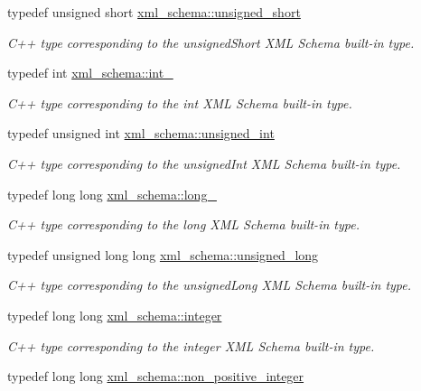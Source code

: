 \begin{DoxyCompactItemize}
typedef unsigned short \hyperlink{namespacexml__schema_a7fc7b4a846c512c370346e15dfdcecaa}{xml\+\_\+schema\+::unsigned\+\_\+short}
\begin{DoxyCompactList}\small\item\em C++ type corresponding to the unsigned\+Short X\+M\+L Schema built-\/in type. \end{DoxyCompactList}\item 
typedef int \hyperlink{namespacexml__schema_acfa24ac68e1a188e7f44c36f7a158bf4}{xml\+\_\+schema\+::int\+\_\+}
\begin{DoxyCompactList}\small\item\em C++ type corresponding to the int X\+M\+L Schema built-\/in type. \end{DoxyCompactList}\item 
typedef unsigned int \hyperlink{namespacexml__schema_a85ca3205d8af287e149aac54535f57e7}{xml\+\_\+schema\+::unsigned\+\_\+int}
\begin{DoxyCompactList}\small\item\em C++ type corresponding to the unsigned\+Int X\+M\+L Schema built-\/in type. \end{DoxyCompactList}\item 
typedef long long \hyperlink{namespacexml__schema_a1d78aacee49e26cb7a69d5aa97df1268}{xml\+\_\+schema\+::long\+\_\+}
\begin{DoxyCompactList}\small\item\em C++ type corresponding to the long X\+M\+L Schema built-\/in type. \end{DoxyCompactList}\item 
typedef unsigned long long \hyperlink{namespacexml__schema_a4413fbcf4c65ffc7aaafe465d72fcb33}{xml\+\_\+schema\+::unsigned\+\_\+long}
\begin{DoxyCompactList}\small\item\em C++ type corresponding to the unsigned\+Long X\+M\+L Schema built-\/in type. \end{DoxyCompactList}\item 
typedef long long \hyperlink{namespacexml__schema_aaaea7c8ce4dfbe26cc52c91c29c97b7c}{xml\+\_\+schema\+::integer}
\begin{DoxyCompactList}\small\item\em C++ type corresponding to the integer X\+M\+L Schema built-\/in type. \end{DoxyCompactList}\item 
typedef long long \hyperlink{namespacexml__schema_a3de6073e510eb8edd71ddc6e0256e2f9}{xml\+\_\+schema\+::non\+\_\+positive\+\_\+integer}

\end{DoxyCompactItemize}
